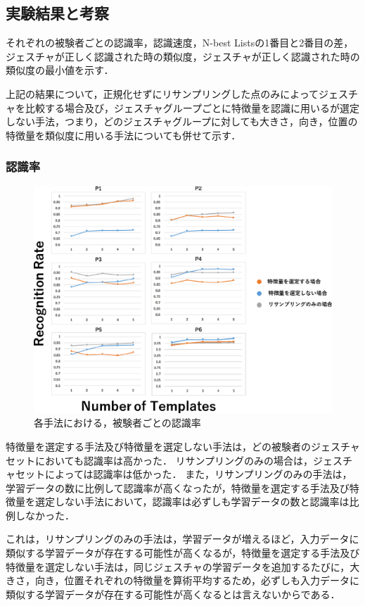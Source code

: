 \subsection{実験結果と考察}
それぞれの被験者ごとの認識率，認識速度，N-best Listsの1番目と2番目の差，ジェスチャが正しく認識された時の類似度，ジェスチャが正しく認識された時の類似度の最小値を示す．

上記の結果について，正規化せずにリサンプリングした点のみによってジェスチャを比較する場合及び，ジェスチャグループごとに特徴量を認識に用いるが選定しない手法，つまり，どのジェスチャグループに対しても大きさ，向き，位置の特徴量を類似度に用いる手法についても併せて示す．

\subsubsection{認識率}
\begin{figure}[!h]
\centering
\includegraphics[width=1.0\columnwidth]{img/pre_rec.eps}
\caption{各手法における，被験者ごとの認識率}
\label{fig:rare_rec}
\end{figure}

特徴量を選定する手法及び特徴量を選定しない手法は，どの被験者のジェスチャセットにおいても認識率は高かった．
リサンプリングのみの場合は，ジェスチャセットによっては認識率は低かった．
また，リサンプリングのみの手法は，学習データの数に比例して認識率が高くなったが，特徴量を選定する手法及び特徴量を選定しない手法において，認識率は必ずしも学習データの数と認識率は比例しなかった．

これは，リサンプリングのみの手法は，学習データが増えるほど，入力データに類似する学習データが存在する可能性が高くなるが，特徴量を選定する手法及び特徴量を選定しない手法は，同じジェスチャの学習データを追加するたびに，大きさ，向き，位置それぞれの特徴量を算術平均するため，必ずしも入力データに類似する学習データが存在する可能性が高くなるとは言えないからである．

